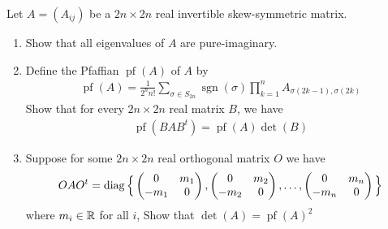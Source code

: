 \documentclass{report}
\begin{document}
\begin{question}{}{}
Let $A=(A_{ij})$ be a $2n\times 2n$ real invertible skew-symmetric  matrix. 
\begin{enumerate}[label=(\alph*)]
  \item Show that all eigenvalues of $A$ are pure-imaginary. 
  \item Define the Pfaffian $\operatorname{pf}(A)$ of $A$ by 
     \begin{align*}
    \operatorname{pf}(A)= \frac{1}{2^nn!}\sum_{\sigma \in S_{2n}}\operatorname{sgn}(\sigma) \prod_{k=1}^n A_{\sigma (2k-1),\sigma (2k)} 
    \end{align*}
  Show that for every $2n\times 2n$ real matrix $B$, we have 
   \begin{align*}
  \operatorname{pf}(BAB^t)= \operatorname{pf}(A)\operatorname{det}(B)
  \end{align*}
\item Suppose for some $2n\times 2n$ real orthogonal matrix $O$ we have 
  \begin{align*}
  OAO^t=\operatorname{diag} \Big\{ \begin{pmatrix} 
      0 & m_1 \\
       -m_1 & 0 
  \end{pmatrix} , \begin{pmatrix} 
       0 & m_2 \\
       -m_2 & 0 
  \end{pmatrix} ,\dots ,\begin{pmatrix} 
       0 & m_n \\
       -m_n & 0 
   \end{pmatrix} \Big\}
  \end{align*}
where $m_i \in\mathbb{R}$ for all $i$, Show that $\operatorname{det}(A)=\operatorname{pf}(A)^2$
\end{enumerate}
\end{question}
\end{document}
